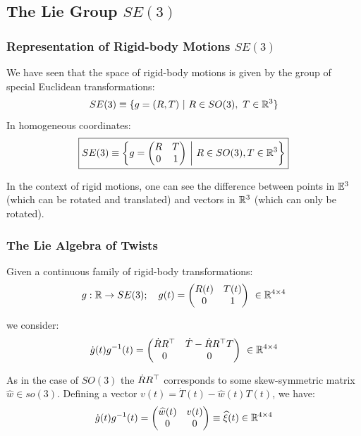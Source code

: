 \subsection{The Lie Group $SE(3)$}%
\label{sub:the_lie_group_se_3_}


\subsubsection{Representation of Rigid-body Motions $SE(3)$}%
\label{ssub:representation_of_rigid_body_motions_se_3_}

We have seen that the space of rigid-body motions is given by
the group of special Euclidean transformations:
	\[SE(3) \equiv \{ g = (R,T)\ |\ R \in SO(3),\ T \in \mathbb{R}^3\}\]
In homogeneous coordinates:
	\[\boxed{SE(3) \equiv
	\left\{ g = \begin{pmatrix}
		R & T \\
		0 & 1 \\
	\end{pmatrix}\ \middle|\ R \in SO(3), T \in \mathbb{R}^3\right\}}\]

In the context of rigid motions, one can see the difference
between points in $\mathbb{E}^3$ (which can be rotated and translated)
and vectors in $\mathbb{R}^3$ (which can only be rotated).


\subsubsection{The Lie Algebra of Twists}%
\label{ssub:the_lie_algebra_of_twists}

Given a continuous family of rigid-body transformations:
	\[g : \mathbb{R} \rightarrow SE(3);\quad g(t) = \begin{pmatrix}
		R(t) & T(t) \\
		0 & 1 \\
	\end{pmatrix}\ \in \mathbb{R}^{4 \times{} 4}\]

we consider:
	\[\dot{g}(t)g^{-1}(t) = \begin{pmatrix}
		\dot{R}R^{\top} & \dot{T} - \dot{R}R^{\top}T \\
		0 & 0 \\
	\end{pmatrix}\ \in \mathbb{R}^{4 \times{} 4}\]

As in the case of $SO(3)$ the $\dot{R}R^{\top}$ corresponds
to some skew-symmetric matrix $\widehat{w} \in so(3)$. Defining a vector
$v(t) = \dot{T}(t) - \widehat{w}(t)T(t)$, we have:
	\[\dot{g}(t)g^{-1}(t) = \begin{pmatrix}
		\widehat{w}(t) & v(t) \\
		0 & 0 \\
	\end{pmatrix} \equiv \widehat{\xi}(t) \in \mathbb{R}^{4 \times{} 4}\]


